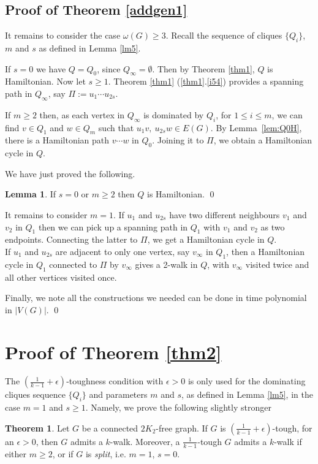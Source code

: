 \documentclass{amsart}
\theoremstyle{definition}
\newtheorem{theorem}{Theorem}
\newtheorem{lemma}{Lemma}
\begin{document}
\subsection{Proof of Theorem \ref{addgen1}}
It remains to consider the case $\omega(G)\ge3$.
Recall the sequence of cliques $\{Q_i\}$, $m$ and $s$ as defined in Lemma \ref{lm5}.


If $s=0$ we have $Q=Q_0$, since $Q_{\infty}=\emptyset$. Then by Theorem \ref{thm1}, $Q$ is Hamiltonian.
Now let $s\geq 1$. 
Theorem \ref{thm1} (\ref{thm1}.\ref{i54}) provides 
a spanning path in $Q_{\infty}$, say $\Pi:=u_1\cdots u_{2s}$. 

If $m\ge2$ then, 
as each vertex in $Q_{\infty}$ is dominated by $Q_i$, for $1\le i\le m$, we
can find $v\in Q_1$ and $w\in Q_m$ such that
$u_1v,~u_{2s}w\in E(G)$. By Lemma~\ref{lem:Q0H}, there is a Hamiltonian path  $v\cdots w$ in $Q_0$.
Joining it to $\Pi$, we obtain a Hamiltonian cycle in $Q$.

We have just proved the following.
\begin{lemma}\label{lem:HamQ}
If $s=0$ or $m\geq 2$ then $Q$ is Hamiltonian. \qed
\end{lemma}
It remains to consider {$m=1$}.
If $u_1$ and $u_{2s}$ have two different neighbours $v_1$ and $v_2$ in $Q_1$
then we can pick up a spanning path in $Q_1$ with $v_1$ and $v_2$ as two endpoints. 
Connecting the latter to $\Pi$, we get a Hamiltonian cycle in $Q$. \\
If $u_1$ and $u_{2s}$ are adjacent to only one vertex, say $v_{\infty}$ in $Q_1$, 
then a Hamiltonian cycle in $Q_1$
connected to $\Pi$ by $v_{\infty}$ gives a 2-walk in $Q$, with $v_{\infty}$ visited twice and all other vertices visited once. 

Finally, we note all the constructions we needed can be done in time polynomial in $|V(G)|$.
\qed

\section{Proof of Theorem \ref{thm2}}
The $(\frac{1}{k-1}+\epsilon)$-toughness condition with $\epsilon>0$ 
is only used for the dominating cliques sequence $\{Q_i\}$ 
and parameters $m$ and $s$, as defined in Lemma \ref{lm5},
in the case $m=1$ and $s\geq 1$. Namely, we prove the following
slightly stronger
\begin{theorem}\label{opt}
Let $G$ be a connected $2K_2$-free graph.
If $G$ is $\left(\frac{1}{k-1}+\epsilon\right)$-tough, for an
$\epsilon>0$, then $G$ admits a $k$-walk. 
Moreover, a $\frac{1}{k-1}$-tough $G$ admits a $k$-walk if either
$m\ge2$, or if $G$ is {\em split}, i.e. $m=1$, $s=0$.  
\end{theorem}
\end{document}
